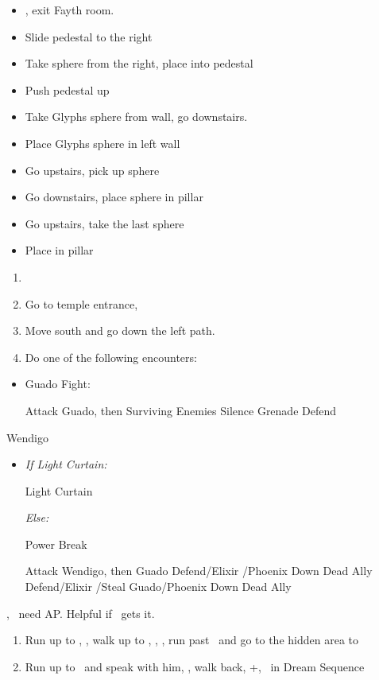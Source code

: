 \begin{trial}
  \begin{itemize}
    \item \save, exit Fayth room.
    \item Slide pedestal to the right
    \item Take sphere from the right, place into pedestal
    \item Push pedestal up
    \item Take Glyphs sphere from wall, go downstairs.
    \item Place Glyphs sphere in left wall
    \item Go upstairs, pick up sphere
    \item Go downstairs, place sphere in pillar
    \item Go upstairs, take the last sphere
    \item Place in pillar
  \end{itemize}
\end{trial}
\begin{enumerate}[resume]
  \item \formation{\rikku}{\tidus}{\yuna}
  \item Go to temple entrance, \sd
  \item Move south and go down the left path.
  \vfill
  \newpage
  \item Do one of the following encounters:
\end{enumerate}
\begin{encounters}
  \begin{itemize}
    \item Guado Fight:
          \begin{itemize}
            \tidusf Attack Guado, then Surviving Enemies
            \rikkuf Silence Grenade
            \yunaf Defend
          \end{itemize}
  \end{itemize}
\end{encounters}
\begin{battle}[18000]{Wendigo}
  \begin{itemize}
    \tidusf Haste \tidus
    \tidusf Switch Weapon to Brotherhood
    \tidusf Attack Guado B (Top One)
    \item \textit{If Light Curtain:}
    \begin{itemize}
	    \rikkuf Light Curtain \tidus
    \end{itemize}
    \textit{Else:}
    \begin{itemize}
    		\switch{\rikku}{\auron}
    		\auronf Power Break
	\end{itemize}
    \tidusf Attack Wendigo, then Guado
    \yunaf Defend/Elixir \tidus/Phoenix Down Dead Ally
    \rikkuf Defend/Elixir \tidus/Steal Guado/Phoenix Down Dead Ally
    \switch{\yuna}{\lulu}
  \end{itemize}
\yuna, \tidus\ need AP. Helpful if \lulu\ gets it.
\end{battle}
\begin{enumerate}[resume]
  \item Run up to \rikku, \sd, walk up to \yuna, \sd, \save, run past \kimahri\ and go to the hidden area to 
  \item Run up to \auron\ and speak with him, \sd, walk back, \cs+\skippablefmv[1:00], \sd\ in Dream Sequence
\end{enumerate}